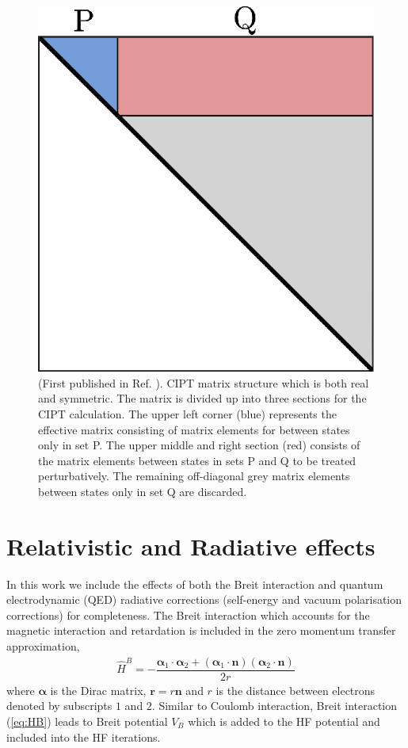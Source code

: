 \documentclass[8pt,a4paper, twoside]{report}
\begin{document}
\begin{figure}
\center
\includegraphics[scale=1]{./figures/CIPT_matrix.eps}
\caption{(First published in Ref. \cite{Dzuba2017}). CIPT matrix structure which is both real and symmetric. The matrix is divided up into three sections for the CIPT calculation. The upper left corner (blue) represents the effective matrix consisting of matrix elements for between states only in set P. The upper middle and right section (red) consists of the matrix elements between states in sets P and Q to be treated perturbatively. The remaining off-diagonal grey matrix elements between states only in set Q are discarded. \label{fig:CIPT_matrix}}
\end{figure}
\section{Relativistic and Radiative effects}
In this work we include the effects of both the Breit interaction \cite{Breit1929, Mann1971} and quantum electrodynamic (QED) radiative corrections (self-energy and vacuum polarisation corrections) \cite{FG2005} for completeness. The Breit interaction which accounts for the magnetic interaction and retardation is included in the zero momentum transfer approximation,
\begin{align}\label{eq:HB}
\hat{H}^B = -\dfrac{\boldsymbol{\alpha}_1 \cdot \boldsymbol{\alpha}_2 + \left(\boldsymbol{\alpha}_1\cdot\textbf{n}\right)\left(\boldsymbol{\alpha}_2\cdot \textbf{n}\right)}{2r}
\end{align}
where $\boldsymbol{\alpha}$ is the Dirac matrix, $\textbf{r}=r\textbf{n}$ and $r$ is the distance between electrons 
denoted by subscripts $1$ and $2$.  Similar to Coulomb interaction, Breit interaction (\ref{eq:HB}) leads to Breit potential
$V_B$ which is added to the HF potential and included into the HF iterations.
\end{document}
